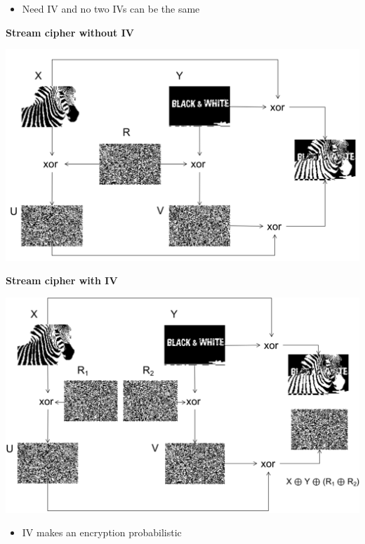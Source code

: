\documentclass[landscape,a4paper]{extarticle}
\newenvironment{Figure}
  {\par\noindent\minipage{\linewidth}}
  {\endminipage\par\medskip}
\begin{document}
\begin{multicols*}{5}
    \begin{itemize}
        \item Need IV and no two IVs can be the same
    \end{itemize}

    \textbf{Stream cipher without IV}
    \begin{Figure}
        \centering
        \includegraphics[width=\linewidth]{stream_cipher_without_iv.png}        
    \end{Figure}

    \textbf{Stream cipher with IV}
    \begin{Figure}
        \centering
        \includegraphics[width=\linewidth]{stream_cipher_with_iv.png}        
    \end{Figure}

    \begin{itemize}
        \item IV makes an encryption probabilistic
    \end{itemize}
    

\end{multicols*}
\end{document}
